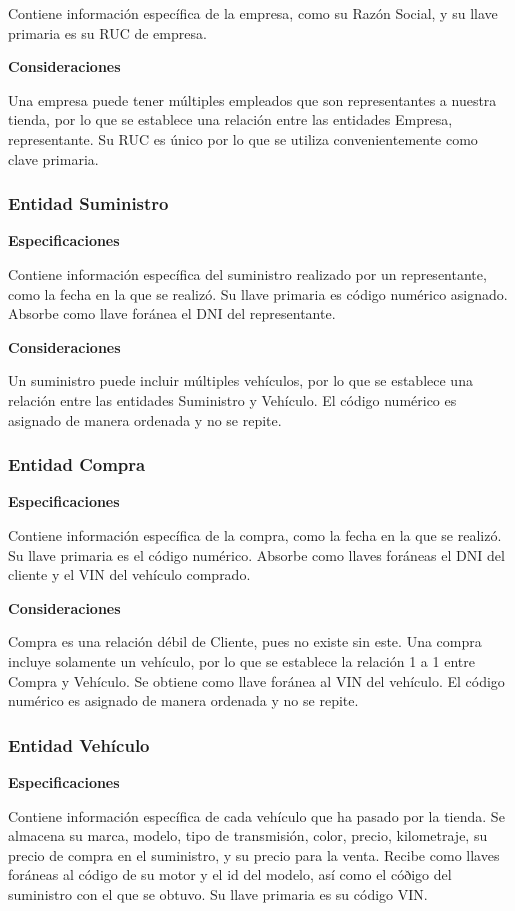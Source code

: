 \documentclass[12pt]{article}
\begin{document}
Contiene información específica de la empresa, como su Razón Social, y su llave primaria es su RUC de empresa.

\textbf{Consideraciones}

Una empresa puede tener múltiples empleados que son representantes a nuestra tienda, por lo que se establece una relación entre las entidades Empresa, representante. Su RUC es único por lo que se utiliza convenientemente como clave primaria.

\subsubsection{Entidad Suministro}
\textbf{Especificaciones}

Contiene información específica del suministro realizado por un representante, como la fecha en la que se realizó. Su llave primaria es código numérico asignado. Absorbe como llave foránea el DNI del representante.

\textbf{Consideraciones}

Un suministro puede incluir múltiples vehículos, por lo que se establece una relación entre las entidades Suministro y Vehículo. El código numérico es asignado de manera ordenada y no se repite.

\subsubsection{Entidad Compra}
\textbf{Especificaciones}

Contiene información específica de la compra, como la fecha en la que se realizó. Su llave primaria es el código numérico. Absorbe como llaves foráneas el DNI del cliente y el VIN del vehículo comprado.

\textbf{Consideraciones}

Compra es una relación débil de Cliente, pues no existe sin este. Una compra incluye solamente un vehículo, por lo que se establece la relación 1 a 1 entre Compra y Vehículo. Se obtiene como llave foránea al VIN del vehículo. El código numérico es asignado de manera ordenada y no se repite.

\subsubsection{Entidad Vehículo}
\textbf{Especificaciones}

Contiene información específica de cada vehículo que ha pasado por la tienda. Se almacena su marca, modelo, tipo de transmisión, color, precio, kilometraje, su precio de compra en el suministro, y su precio para la venta. Recibe como llaves foráneas al código de su motor y el id del modelo, así como el cóðigo del suministro con el que se obtuvo. Su llave primaria es su código VIN.
\end{document}
